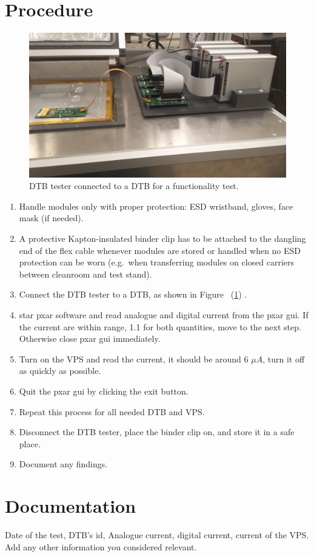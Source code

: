 \documentclass[12pt]{unlsilabsop}
\begin{document}
\section{Procedure}
\begin{figure}[hhhh]
\begin{center}
\includegraphics[scale=0.05]{img/DTB_2}
\vspace{0.5cm}
\caption{DTB tester connected to a DTB for a functionality test.}
\label{dtb}
\end{center}
\vspace{1cm}
\end{figure}

\begin{enumerate}
    \item Handle modules only with proper protection: ESD wristband, gloves, face mask (if needed).
    \item A protective Kapton-insulated binder clip has to be attached to the dangling end of the flex cable whenever modules are stored or handled when no ESD protection can be worn (e.g.~when transferring modules on closed carriers between cleanroom and test stand).
    \item Connect the DTB tester to a DTB, as shown in Figure ~(\ref{dtb}) .
    \item star pxar software and read analogue and digital current from the pxar gui. If the current are within range, 1.1 for both quantities, move to the next step. Otherwise close pxar gui immediately.
    \item Turn on the VPS and read the current, it should be around 6 $\mu A$, turn it off as quickly as possible.
    \item Quit the pxar gui by clicking the exit button.
    \item Repeat this process for all needed DTB and VPS.
	\item Disconnect the DTB tester, place the binder clip on, and store it in a safe place.  	
    \item Document any findings.
\end{enumerate}

\section{Documentation}
Date of the test, DTB's id, Analogue current, digital current, current of the VPS. Add any other information you considered relevant.
\end{document}
